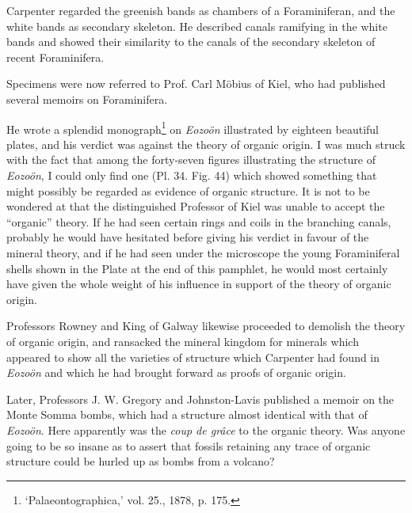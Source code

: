 \documentclass[a4paper, 12pt, oneside]{article}
\begin{document}
Carpenter regarded the greenish bands as chambers of a Foraminiferan, and the white bands as secondary skeleton. He described canals ramifying in the white bands and showed their similarity to the canals of the secondary skeleton of recent Foraminifera.

Specimens were now referred to Prof. Carl Möbius of Kiel, who had published several memoirs on Foraminifera.

He wrote a splendid monograph\footnote{`Palaeontographica,' vol. 25., 1878, p. 175.} on \emph{Eozoön} illustrated by eighteen beautiful plates, and his verdict was against the theory of organic origin. I was much struck with the fact that among the forty-seven figures illustrating the structure of \emph{Eozoön}, I could only find one (Pl. 34. Fig. 44) which showed something that might possibly be regarded as evidence of organic structure. It is not to be wondered at that the distinguished Professor of Kiel was unable to accept the ``organic'' theory. If he had seen certain rings and coils in the branching canals, probably he would have hesitated before giving his verdict in favour of the mineral theory, and if he had seen under the microscope the young Foraminiferal shells shown in the Plate at the end of this pamphlet, he would most certainly have given the whole weight of his influence in support of the theory of organic origin.

Professors Rowney and King of Galway likewise proceeded to demolish the theory of organic origin, and ransacked the mineral kingdom for minerals which appeared to show all the varieties of structure which Carpenter had found in \emph{Eozoön} and which he had brought forward as proofs of organic origin.

Later, Professors J. W. Gregory and Johnston-Lavis published a memoir on the Monte Somma bombs, which had a structure almost identical with that of \emph{Eozoön}. Here apparently was the \emph{coup de grâce} to the organic theory. Was anyone going to be so insane as to assert that fossils retaining any trace of organic structure could be hurled up as bombs from a volcano?
\end{document}
